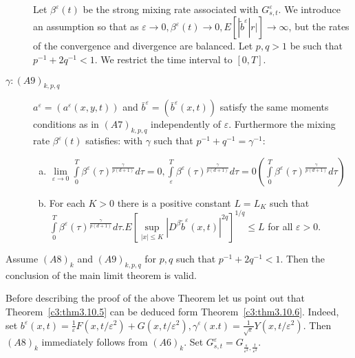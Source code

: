 \begin{theorem}
\begin{description}
    Let $\beta^{\varepsilon}(t)$ be the strong mixing rate associated
    with $G^{\varepsilon}_{s,t}$. We introduce an assumption so that
    as $\varepsilon \to 0,\beta^{\varepsilon}(t) \to 0,
    E[|\tilde{b}^{\varepsilon}|r|] \to \infty $, but the rates of the
      convergence and divergence are balanced. Let $p,q>1$ be such
      that $p^{-1} + 2q^{-1} < 1$. We restrict the time interval to
      $[0,T]$.
 
    \item [$\gamma:  (A9)_{k,p,q}$] $a^{\varepsilon} =
      (a^{\varepsilon}(x,y,t))$ and $\bar{b}^{\varepsilon} =
      (\bar{b}^{\varepsilon}(x,t))$ satisfy the same moments
      conditions as in $(A7)_{k,p,q}$ independently of
      $\varepsilon$. Furthermore the mixing rate
      $\beta^{\varepsilon}(t)$ satisfies: with $\gamma$ such that
      $p^{-1}+q^{-1} = \gamma^{-1}$: 
      \begin{enumerate}[(a)] 
      \item $\lim \limits_{\varepsilon \to 0} \int \limits^T_0
        \beta^{\varepsilon}(\tau)^{\frac{\gamma}{p(d+1)}}d \tau =0,
        \int\limits^T_{\varepsilon} \beta^{\varepsilon}
        (\tau)^{\frac{\gamma}{p(d+1)}}d \tau = 0\left( 
        \int \limits^T_0
        \beta^{\varepsilon}(\tau)^{\frac{\gamma}{p(d+1)}}d \tau \right)$ 
 
     \item For each $K>0$ there is a positive constant $L =L_K$ such
        that $ \int \limits^T_0
        \beta^{\varepsilon}(\tau)^{\frac{\gamma}{p(d+1)}}d \tau.  E\left[
          \sup \limits_{|x| \leq K}| D^{\beta}
          \tilde{b}^{\varepsilon}(x,t)|^{2q}\right]^{1 /q} \leq L$ for all
        $\varepsilon > 0$. 
      \end{enumerate}
  \end{description}
\end{theorem}

\setcounter{theorem}{5}
\begin{theorem}\label{c3:thm3.10.6} %
  Assume $(A8)_k$ and $(A9)_{k,p,q}$ for $p,q$ such that $p^{-1}+
  2q^{-1} <1$. Then the conclusion of the main limit theorem is
  valid. 

  Before describing the proof of the above Theorem let us point out that
  Theorem~\ref{c3:thm3.10.5} can be deduced form Theorem~\ref{c3:thm3.10.6}. 
  Indeed, set $b^{\varepsilon}(x,t) = \frac{1}{\varepsilon} F(x,t/ \varepsilon^2) +
  G(x, t / \varepsilon^2), \gamma^{\varepsilon}(x.t) =
  \frac{1}{\sqrt{\varepsilon}}Y(x,t/ \varepsilon^2)$. Then $(A8)_k$
  immediately follows from $(A6)_k$. Set $G^{\varepsilon}_{s,t} = 
  G_{\frac{s}{\varepsilon^2}, \frac{t}{\varepsilon^2}}$.  
\end{theorem}

